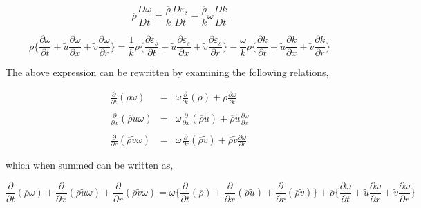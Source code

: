 \begin{displaymath}
	\overline{\rho}\frac{D\omega}{Dt} = \frac{\overline{\rho}}{k}\frac{D\varepsilon_s}{Dt} 
	-\frac{\overline{\rho}}{k}\omega\frac{Dk}{Dt} 
\end{displaymath}

\begin{equation}
	\overline{\rho}\Big\{\frac{\partial\omega}{\partial t} + \tilde u\frac{\partial\omega}{\partial x} 
	+ \tilde v\frac{\partial\omega}{\partial r}\Big\} = 
	\frac{1}{k}\overline{\rho}\Big\{\frac{\partial\varepsilon_s}{\partial t} + \tilde u\frac{\partial\varepsilon_s}{\partial x}
	+ \tilde v\frac{\partial\varepsilon_s}{\partial r}\Big\} - \frac{\omega}{k}\overline{\rho}
	\Big\{\frac{\partial k}{\partial t} + \tilde u\frac{\partial k}{\partial x} 
	+ \tilde v\frac{\partial k}{\partial r}\Big\}
\label{eqn:diss}
\end{equation}

	The above expression can be rewritten by examining the following relations,

\begin{displaymath}
	\begin{array}{ccc}
		\frac{\partial}{\partial t}(\overline{\rho}\omega) & = & \omega\frac{\partial}{\partial t}(\overline{\rho})
		+ \overline{\rho}\frac{\partial\omega}{\partial t} \\ \\
		\frac{\partial}{\partial x}(\overline{\rho}\tilde u\omega) & = & 
		\omega\frac{\partial}{\partial x}(\overline{\rho}\tilde u)+ \overline{\rho}\tilde u\frac{\partial\omega}{\partial x}
		\\ \\
		\frac{\partial}{\partial r}(\overline{\rho}\tilde v\omega) & = & 
		\omega\frac{\partial}{\partial r}(\overline{\rho}\tilde v)+ \overline{\rho}\tilde v\frac{\partial\omega}{\partial r}
	\end{array}
\end{displaymath}

	which when summed can be written as,

\begin{displaymath}
	\frac{\partial}{\partial t}(\overline{\rho}\omega)+ \frac{\partial}{\partial x}(\overline{\rho}\tilde u\omega)
	+ \frac{\partial}{\partial r}(\overline{\rho}\tilde v\omega) = \omega\Big\{\frac{\partial}{\partial t}(\overline{\rho})
	+ \frac{\partial}{\partial x}(\overline{\rho}\tilde u) + \frac{\partial}{\partial r}(\overline{\rho}\tilde v) \Big\}
	+ \overline{\rho}\Big\{\frac{\partial\omega}{\partial t} + \tilde u\frac{\partial\omega}{\partial x}
	+ \tilde v\frac{\partial\omega}{\partial r}\Big\}
\end{displaymath}

